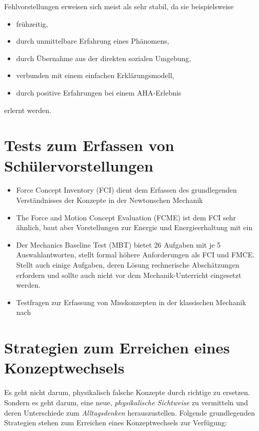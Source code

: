 \mip
Fehlvorstellungen erweisen sich meist als sehr stabil, da sie beispielsweise
\begin{itemize}
	\item fr\"{u}hzeitig,
	\item durch unmittelbare Erfahrung eines Ph\"{a}nomens,
	\item durch \"{U}bernahme aus der direkten sozialen Umgebung,
	\item verbunden mit einem einfachen Erkl\"{a}rungsmodell,
	\item durch positive Erfahrungen bei einem AHA-Erlebnis
\end{itemize}
erlernt werden.

\bip\bip
\section{Tests zum Erfassen von Schülervorstellungen}

\begin{itemize}
\item Force Concept Inventory (FCI) dient dem Erfassen des grundlegenden Verst\"{a}ndnisses der Konzepte in der Newtonschen Mechanik
\item The Force and Motion Concept Evaluation (FCME) ist dem FCI sehr \"{a}hnlich, baut aber Vorstellungen zur Energie und Energieerhaltung mit ein
\item Der Mechanics Baseline Test (MBT) bietet 26 Aufgaben mit je 5 Auswahlantworten, stellt formal h\"{o}here Anforderungen als FCI und FMCE. Stellt auch einige Aufgaben, deren L\"{o}sung rechnerische Absch\"{a}tzungen erfordern und sollte auch nicht vor dem Mechanik-Unterricht eingesetzt werden.
\item Testfragen zur Erfassung von Misskonzepten in der klassischen Mechanik nach \textcite[8. Skizze, S. 144 ff.]{Nachtigall}
\end{itemize}

\bip\bip
\section{Strategien zum Erreichen eines Konzeptwechsels}
Es geht nicht darum, physikalisch falsche Konzepte durch richtige zu ersetzen. Sondern es geht darum, eine neue, \emph{physikalische Sichtweise} zu vermitteln und deren Unterschiede zum \emph{Alltagsdenken} herauszustellen. Folgende grundlegenden Strategien stehen zum Erreichen eines Konzeptwechsels zur Verf{\"u}gung:

